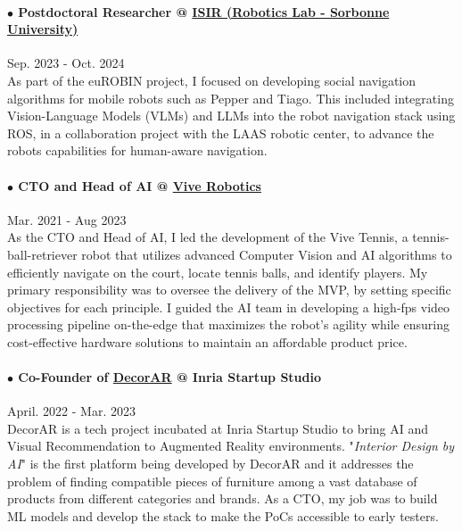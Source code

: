 \documentclass[10pt]{res}
\begin{document}
\begin{resume}
\paragraph{$\bullet$ Postdoctoral Researcher @ \href{https://isir.upmc.fr/} {ISIR (Robotics Lab - Sorbonne University)}} \hfill Sep. 2023 - Oct. 2024\\
As part of the euROBIN project, I focused on developing social navigation algorithms for mobile robots such as Pepper and Tiago. This included integrating Vision-Language Models (VLMs) and LLMs into the robot navigation stack using ROS, in a collaboration project with the LAAS robotic center, to advance the robots capabilities for human-aware navigation.
\vspace{-12pt}

\paragraph{$\bullet$ CTO and Head of AI @ \href{http://vivetennis.com} {Vive Robotics}} \hfill Mar. 2021 - Aug 2023\\
As the CTO and Head of AI, I led the development of the Vive Tennis, a tennis-ball-retriever robot that utilizes advanced Computer Vision and AI algorithms to efficiently navigate on the court, locate tennis balls, and identify players. My primary responsibility was to oversee the delivery of the MVP, by setting specific objectives for each principle. I guided the AI team in developing a high-fps video processing pipeline on-the-edge that maximizes the robot's agility while ensuring cost-effective hardware solutions to maintain an affordable product price.
\vspace{-12pt}

\paragraph{$\bullet$ Co-Founder of \href{http://decorar.ai} {DecorAR} @ Inria Startup Studio} \hfill April. 2022 - Mar. 2023\\
DecorAR is a tech project incubated at Inria Startup Studio to bring AI and Visual Recommendation to Augmented Reality environments. "\textit{Interior Design by AI}" is the first platform being developed by DecorAR and it addresses the problem of finding compatible pieces of furniture among a vast database of products from different categories and brands. As a CTO, my job was to build ML models and develop the stack to make the PoCs accessible to early testers.
\vspace{-12pt}


\end{resume}
\end{document}
